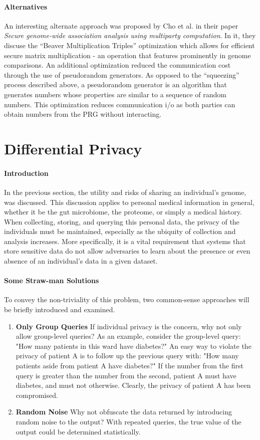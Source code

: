 \paragraph{Alternatives}
An interesting alternate approach was proposed by Cho et al. in their paper \textit{Secure genome-wide association analysis using multiparty computation}. In it, they discuse the ``Beaver Multiplication Triples'' optimization which allows for efficient secure matrix multiplication - an operation that features prominently in genome comparisons. An additional optimization reduced the communication cost through the use of pseudorandom generators. As opposed to the ``squeezing'' process described above, a pseudorandom generator is an algorithm that generates numbers whose properties are similar to a sequence of random numbers. This optimization reduces communication i/o as both parties can obtain numbers from the PRG without interacting.\cite{natureopt}

\pagebreak
\section{Differential Privacy}

\paragraph{Introduction}
In the previous section, the utility and risks of sharing an individual's genome, was discussed. This discussion applies to personal medical information in general, whether it be the gut microbiome, the proteome, or simply a medical history. When collecting, storing, and querying this personal data, the privacy of the individuals must be maintained, especially as the ubiquity of collection and analysis increases. More specifically, it is a vital requirement that systems that store sensitive data do not allow adversaries to learn about the presence or even absence of an individual's data in a given dataset.

\paragraph{Some Straw-man Solutions}
To convey the non-triviality of this problem, two common-sense approaches will be briefly introduced and examined.

\begin{enumerate}
\item \textbf{Only Group Queries} If individual privacy is the concern, why not only allow group-level queries? As an example, consider the group-level query: "How many patients in this ward have diabetes?" An easy way to violate the privacy of patient A is to follow up the previous query with: "How many patients aside from patient A have diabetes?" If the number from the first query is greater than the number from the second, patient A must have diabetes, and must not otherwise. Clearly, the privacy of patient A has been compromised.
\item \textbf{Random Noise} Why not obfuscate the data returned by introducing random noise to the output? With repeated queries, the true value of the output could be determined statistically.
\end{enumerate}

